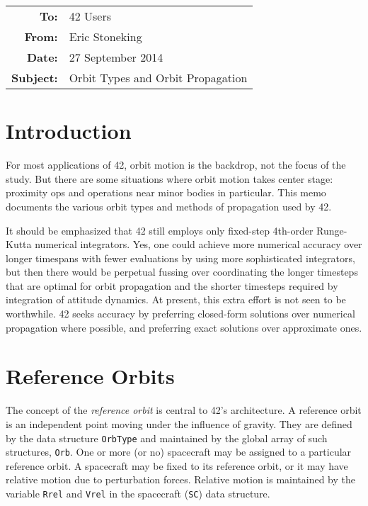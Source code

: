 \documentclass[12pt]{article}
\begin{document}
\begin{tabular}{@{} rl @{}}
    {\bf To:} & 42 Users \\ 
    {\bf From:} & Eric Stoneking \\ 
    {\bf Date:} &  27 September 2014\\ 
    {\bf Subject:} & Orbit Types and Orbit Propagation \\ 
\hline
\end{tabular}
  
  
\section{Introduction}

For most applications of 42, orbit motion is the backdrop, not the focus of the study.  But there are some situations where orbit motion takes center stage: proximity ops and operations near minor bodies in particular.  This memo  documents the various orbit types and methods of propagation used by 42.

It should be emphasized that 42 still employs only fixed-step 4th-order Runge-Kutta numerical integrators.  Yes, one could achieve more numerical accuracy over longer timespans with fewer evaluations by using more sophisticated integrators, but then there would be perpetual fussing over coordinating the longer timesteps that are optimal for orbit propagation and the shorter timesteps required by integration of attitude dynamics.  At present, this extra effort is not seen to be worthwhile.  42 seeks accuracy by preferring closed-form solutions over numerical propagation where possible, and preferring exact solutions over approximate ones.

\section{Reference Orbits}

The concept of the {\em reference orbit} is central to 42's architecture.  A reference orbit is an independent point moving under the influence of gravity.  They are defined by the data structure {\tt OrbType} and maintained by the global array of such structures, {\tt Orb}.  One or more (or no) spacecraft may be assigned to a particular reference orbit.  A spacecraft may be fixed to its reference orbit, or it may have relative motion due to perturbation forces.  Relative motion is maintained by the variable {\tt Rrel} and {\tt Vrel} in the spacecraft ({\tt SC}) data structure.
\end{document}
